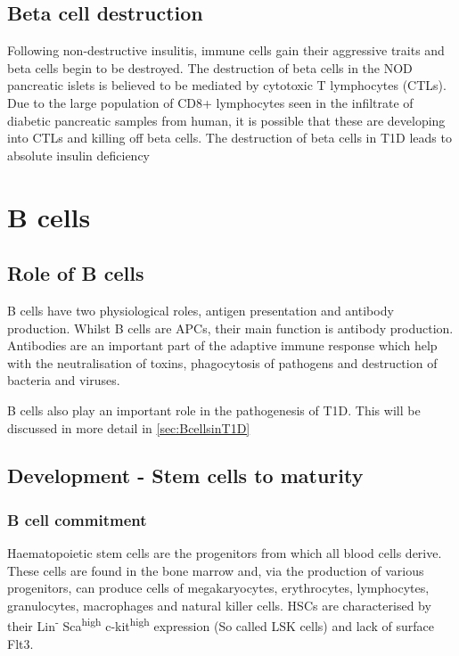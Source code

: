 \subsection{Beta cell destruction}

Following non-destructive insulitis, immune cells gain their aggressive traits and beta cells begin to be destroyed.
The destruction of beta cells in the NOD pancreatic islets is believed to be mediated by cytotoxic T lymphocytes (CTLs)\citep{Thomas2000, Brodie2008}.
Due to the large population of CD8+ lymphocytes seen in the infiltrate of diabetic pancreatic samples from human\citep{Hanafusa2008}, it is possible that these are developing into CTLs and killing off beta cells.
The destruction of beta cells in T1D leads to absolute insulin deficiency \citep{Daneman2006}

\section{B cells}
\subsection{Role of B cells}
\label{subsec:Bcellrole}
B cells have two physiological roles, antigen presentation and antibody production.
Whilst B cells are APCs, their main function is antibody production.
Antibodies are an important part of the adaptive immune response which help with the neutralisation of toxins, phagocytosis of pathogens and destruction of bacteria and viruses.

B cells also play an important role in the pathogenesis of T1D. 
This will be discussed in more detail in \cref{sec:BcellsinT1D}

\subsection{Development - Stem cells to maturity}
\label{subsec:Bcelldevelopment}
\subsubsection{B cell commitment}

Haematopoietic stem cells are the progenitors from which all blood cells derive.
These cells are found in the bone marrow and, via the production of various progenitors, can produce cells of megakaryocytes, erythrocytes, lymphocytes, granulocytes, macrophages and natural killer cells.
HSCs are characterised by their Lin\textsuperscript{-} Sca\textsuperscript{high} c-kit\textsuperscript{high} expression (So called LSK cells) and lack of surface Flt3\citep{Welinder2011}.

